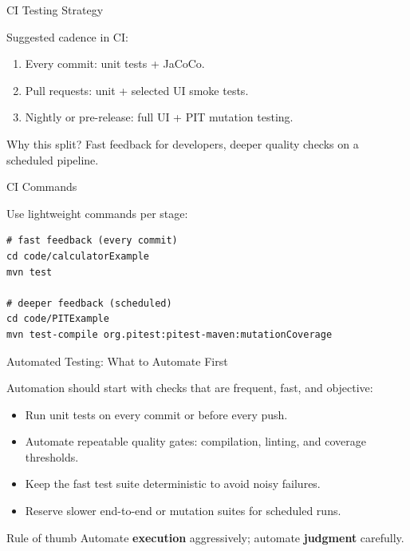 \documentclass[11pt, xcolor=svgnames]{beamer}
\providecommand{\alert}[1]{\textbf{#1}}
\begin{document}

\begin{frame}{CI Testing Strategy}

Suggested cadence in CI:

\begin{enumerate}
  \item Every commit: unit tests + JaCoCo.
  \item Pull requests: unit + selected UI smoke tests.
  \item Nightly or pre-release: full UI + PIT mutation testing.
\end{enumerate}

\begin{block}{Why this split?}
  Fast feedback for developers, deeper quality checks on a scheduled pipeline.
\end{block}

\end{frame}


\begin{frame}[fragile]{CI Commands}

Use lightweight commands per stage:

\begin{lstlisting}[language={}]
# fast feedback (every commit)
cd code/calculatorExample
mvn test

# deeper feedback (scheduled)
cd code/PITExample
mvn test-compile org.pitest:pitest-maven:mutationCoverage
\end{lstlisting}

\end{frame}


\begin{frame}{Automated Testing: What to Automate First}

Automation should start with checks that are frequent, fast, and objective:

\begin{itemize}
  \item Run unit tests on every commit or before every push.
  \item Automate repeatable quality gates: compilation, linting, and coverage thresholds.
  \item Keep the fast test suite deterministic to avoid noisy failures.
  \item Reserve slower end-to-end or mutation suites for scheduled runs.
\end{itemize}

\begin{block}{Rule of thumb}
Automate \alert{execution} aggressively; automate \alert{judgment} carefully.
\end{block}

\end{frame}
\end{document}
